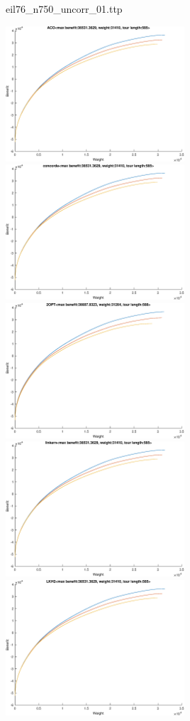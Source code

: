 \documentclass{article}
\begin{document}
\newpage
eil76\_n750\_uncorr\_01.ttp

\noindent
\includegraphics[width=0.5\textwidth]{eil76figs/eil76_n750_uncorr_01.ttp.aco.txt.atsf.eps}
\includegraphics[width=0.5\textwidth]{eil76figs/eil76_n750_uncorr_01.ttp.con.txt.atsf.eps}
\includegraphics[width=0.5\textwidth]{eil76figs/eil76_n750_uncorr_01.ttp.inv.txt.atsf.eps}
\includegraphics[width=0.5\textwidth]{eil76figs/eil76_n750_uncorr_01.ttp.lkh.txt.atsf.eps}
\includegraphics[width=0.5\textwidth]{eil76figs/eil76_n750_uncorr_01.ttp.lkh2.txt.atsf.eps}
\end{document}
